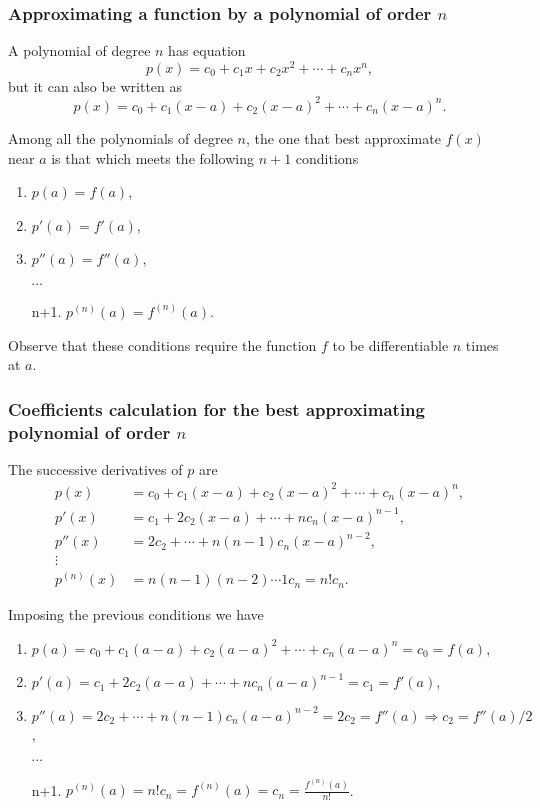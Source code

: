 \begin{frame}
	\frametitle{Approximating a function by a polynomial of order $n$}
	A polynomial of degree $n$ has equation
	\[
		p(x) = c_0+c_1x+c_2x^2+\cdots +c_nx^n,
	\]
	but it can also be written as
	\[
		p(x) = c_0+c_1(x-a)+c_2(x-a)^2+\cdots +c_n(x-a)^n.
	\]
	
	Among all the polynomials of degree $n$, the one that best approximate $f(x)$ near $a$ is that which meets the following $n+1$ conditions
	\begin{enumerate}
		\item $p(a) = f(a)$,
		\item $p'(a) = f'(a)$,
		\item $p''(a)=f''(a)$,
		\item[] $\cdots$
		\item[n+1.] $p^{(n)}(a)=f^{(n)}(a)$.
	\end{enumerate}
	
	\alert{Observe that these conditions require the function $f$ to be differentiable $n$ times at $a$.}
\end{frame}


\begin{frame}
	\frametitle{Coefficients calculation for the best approximating polynomial of order $n$}
	The successive derivatives of $p$ are 
	\begin{align*}
		p(x)       & = c_0+c_1(x-a)+c_2(x-a)^2+\cdots +c_n(x-a)^n, \\
		p'(x)      & = c_1+2c_2(x-a)+\cdots +nc_n(x-a)^{n-1},      \\
		p''(x)     & = 2c_2+\cdots +n(n-1)c_n(x-a)^{n-2},          \\
		\vdots\ \
		\\
		p^{(n)}(x) & = n(n-1)(n-2)\cdots 1 c_n=n!c_n.              
	\end{align*}
	
	Imposing the previous conditions we have
	\begin{enumerate}
		\item $p(a) = c_0+c_1(a-a)+c_2(a-a)^2+\cdots +c_n(a-a)^n=c_0=f(a)$,
		\item $p'(a) = c_1+2c_2(a-a)+\cdots +nc_n(a-a)^{n-1}=c_1=f'(a)$,
		\item $p''(a) = 2c_2+\cdots +n(n-1)c_n(a-a)^{n-2}=2c_2=f''(a)\Rightarrow c_2=f''(a)/2$,
		\item[] $\cdots$
		\item[n+1.] $p^{(n)}(a)=n!c_n=f^{(n)}(a)=c_n=\frac{f^{(n)}(a)}{n!}$.
	\end{enumerate}
\end{frame}


